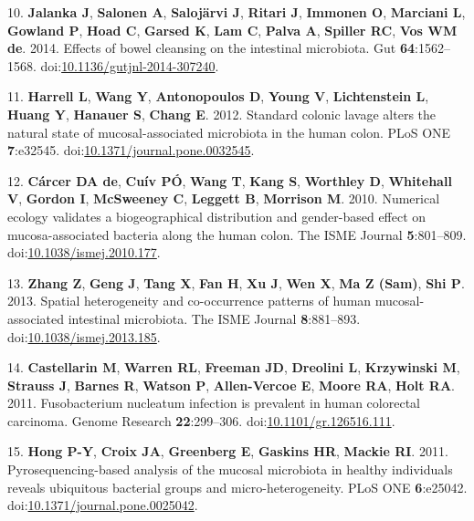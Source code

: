 \documentclass[11pt,]{article}
\begin{document}
\hypertarget{ref-Jalanka2014}{}
10. \textbf{Jalanka J}, \textbf{Salonen A}, \textbf{Salojärvi J},
\textbf{Ritari J}, \textbf{Immonen O}, \textbf{Marciani L},
\textbf{Gowland P}, \textbf{Hoad C}, \textbf{Garsed K}, \textbf{Lam C},
\textbf{Palva A}, \textbf{Spiller RC}, \textbf{Vos WM de}. 2014. Effects
of bowel cleansing on the intestinal microbiota. Gut
\textbf{64}:1562--1568.
doi:\href{https://doi.org/10.1136/gutjnl-2014-307240}{10.1136/gutjnl-2014-307240}.

\hypertarget{ref-Harrell2012}{}
11. \textbf{Harrell L}, \textbf{Wang Y}, \textbf{Antonopoulos D},
\textbf{Young V}, \textbf{Lichtenstein L}, \textbf{Huang Y},
\textbf{Hanauer S}, \textbf{Chang E}. 2012. Standard colonic lavage
alters the natural state of mucosal-associated microbiota in the human
colon. PLoS ONE \textbf{7}:e32545.
doi:\href{https://doi.org/10.1371/journal.pone.0032545}{10.1371/journal.pone.0032545}.

\hypertarget{ref-deCarcer2010}{}
12. \textbf{Cárcer DA de}, \textbf{Cuív PÓ}, \textbf{Wang T},
\textbf{Kang S}, \textbf{Worthley D}, \textbf{Whitehall V},
\textbf{Gordon I}, \textbf{McSweeney C}, \textbf{Leggett B},
\textbf{Morrison M}. 2010. Numerical ecology validates a biogeographical
distribution and gender-based effect on mucosa-associated bacteria along
the human colon. The ISME Journal \textbf{5}:801--809.
doi:\href{https://doi.org/10.1038/ismej.2010.177}{10.1038/ismej.2010.177}.

\hypertarget{ref-Zhang2013}{}
13. \textbf{Zhang Z}, \textbf{Geng J}, \textbf{Tang X}, \textbf{Fan H},
\textbf{Xu J}, \textbf{Wen X}, \textbf{Ma Z (Sam)}, \textbf{Shi P}.
2013. Spatial heterogeneity and co-occurrence patterns of human
mucosal-associated intestinal microbiota. The ISME Journal
\textbf{8}:881--893.
doi:\href{https://doi.org/10.1038/ismej.2013.185}{10.1038/ismej.2013.185}.

\hypertarget{ref-Castellarin2011}{}
14. \textbf{Castellarin M}, \textbf{Warren RL}, \textbf{Freeman JD},
\textbf{Dreolini L}, \textbf{Krzywinski M}, \textbf{Strauss J},
\textbf{Barnes R}, \textbf{Watson P}, \textbf{Allen-Vercoe E},
\textbf{Moore RA}, \textbf{Holt RA}. 2011. Fusobacterium nucleatum
infection is prevalent in human colorectal carcinoma. Genome Research
\textbf{22}:299--306.
doi:\href{https://doi.org/10.1101/gr.126516.111}{10.1101/gr.126516.111}.

\hypertarget{ref-Hong2011}{}
15. \textbf{Hong P-Y}, \textbf{Croix JA}, \textbf{Greenberg E},
\textbf{Gaskins HR}, \textbf{Mackie RI}. 2011. Pyrosequencing-based
analysis of the mucosal microbiota in healthy individuals reveals
ubiquitous bacterial groups and micro-heterogeneity. PLoS ONE
\textbf{6}:e25042.
doi:\href{https://doi.org/10.1371/journal.pone.0025042}{10.1371/journal.pone.0025042}.
\end{document}
